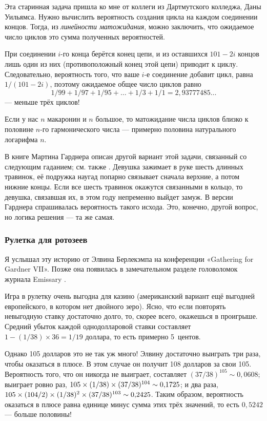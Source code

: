 Эта старинная задача пришла ко мне от коллеги из Дартмутского колледжа, Даны Уильямса.
Нужно вычислить вероятность создания цикла на каждом соединении концов.
Тогда, из \emph{линейности матожидания}, можно заключить, что ожидаемое число циклов это сумма полученных вероятностей.

При соединении $i$-го конца берётся конец цепи, и из оставшихся $101 - 2i$ концов лишь один из них (противоположный конец этой цепи) приводит к циклу.
Следовательно, вероятность того, что ваше $i$-е соединение добавит цикл, равна $1/(101 - 2i)$, поэтому ожидаемое общее число циклов равно 
\[1/99 + 1/97 + 1/95 +\dots + 1/3 + 1/1 = 2{,}93777485\dots\]
--- меньше трёх циклов!

Если у нас $n$ макаронин и $n$ большое, то матожидание числа циклов близко к половине $n$-го гармонического числа --- примерно половина натурального логарифма $n$.

\begin{addedbytheeditors}
В книге Мартина Гарднера \cite[p. 198]{26} описан другой вариант этой задачи, связанный со следующим гаданием; см. также \cite{meshalkin,bavrin-fribus}.
Девушка зажимает в руке шесть длинных травинок, её подружка наугад попарно связывает сначала верхние, а потом нижние концы.
Если все шесть травинок окажутся связанными в кольцо, то девушка, связавшая их, в этом году непременно выйдет замуж.
В версии Гарднера спрашивалась вероятность такого исхода.
Это, конечно, другой вопрос, но логика решения — та же самая. \pr
    
\end{addedbytheeditors}

\subsubsection*{Рулетка для ротозеев}

Я услышал эту историю от Элвина Берлекэмпа на конференции «Gathering for Gardner VII».
Позже она появилась в замечательном разделе головоломок журнала Emissary \cite[весна/осень 2006 года]{3}.

Игра в рулетку очень выгодна для казино (американский вариант ещё выгодней европейского, в котором нет двойного зеро).
Ясно, что если повторять невыгодную ставку достаточно долго, то, скорее всего, окажешься в проигрыше.
Средний убыток каждой однодолларовой ставки составляет $1 - (1/38) \times 36 = 1/19$ доллара, то есть примерно 5~центов.

Однако 105 долларов это не так уж много!
Элвину достаточно выиграть три раза, чтобы оказаться в плюсе.
В этом случае он получит 108 долларов за свои 105.
Вероятность того, что он никогда не выиграет, составляет $(37/38)^{105} \sim 0{,}0608$;
выиграет ровно раз, $105 \times (1/38) \times (37/38)^{104} \z\sim 0{,}1725$;
и два раза, $105 \times (104/2) \times (1/38)^2 \z\times (37/38)^{103} \sim 0{,}2425$.
Таким образом, вероятность оказаться в плюсе равна единице минус сумма этих трёх значений, то есть $0{,}5242$ --- больше половины!

